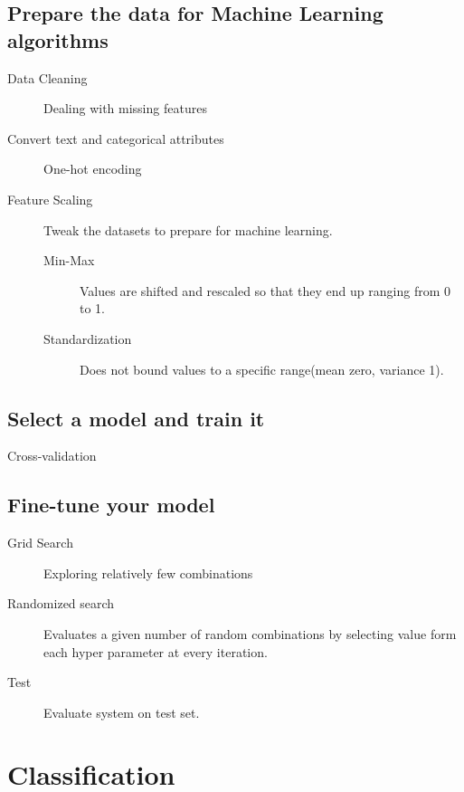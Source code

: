 \documentclass[10pt]{article}
\begin{document}
\subsection{Prepare the data for Machine Learning algorithms}%
\label{sub:prepare_the_data_for_machine_learning_algorithms}

\begin{description}
  \item[Data Cleaning] Dealing with missing features
  \item[Convert text and categorical attributes] One-hot encoding
  \item[Feature Scaling]
    Tweak the datasets to prepare for machine learning.
    \begin{description}
      \item[Min-Max] Values are shifted and rescaled so that they end up
        ranging from 0 to 1.
      \item[Standardization] Does not bound values to a specific range(mean
        zero, variance 1).
    \end{description}
\end{description}

\subsection{Select a model and train it }%
\label{sub:select_a_model_and_train_it_}

Cross-validation

\subsection{Fine-tune your model}%
\label{sub:fine_tune_your_model}

\begin{description}
  \item[Grid Search] Exploring relatively few combinations
  \item[Randomized search] Evaluates a given number of random combinations by
    selecting value form each hyper parameter at every iteration.
  \item[Test] Evaluate system on test set.
\end{description}

\section{Classification}%
\label{sec:classification}
\end{document}
